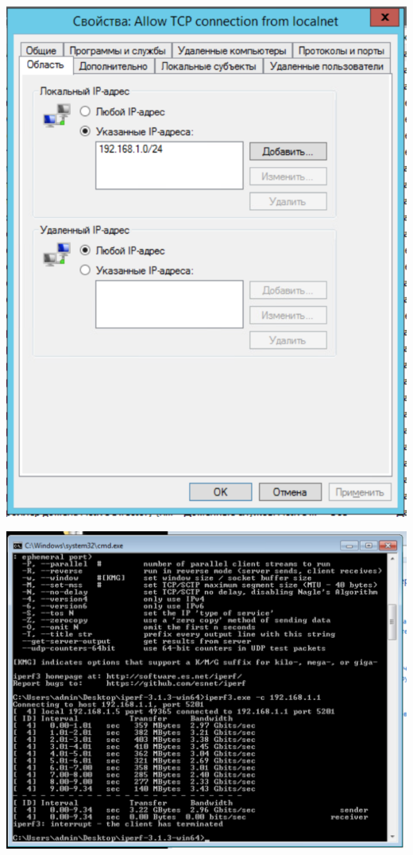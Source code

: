 \documentclass[a4paper,14pt]{extarticle}
\begin{document}
    \begin{center}
        \includegraphics[scale=0.7]{7.1.2.png}
    \end{center}

    \begin{center}
        \includegraphics[scale=0.8]{7.1.3.png}
    \end{center}
\end{document}
